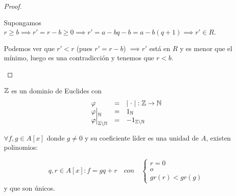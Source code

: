 \begin{proof}
\begin{itemize}
Supongamos $ r \geq b\implies r' = r-b \geq 0 \implies r' = a-bq -b = a -b(q+1)\implies r' \in R$.

Podemos ver que $r' < r$ (pues $r'=r-b$) $\implies  r'$ está en $R$ y es menor que el mínimo, luego es una contradicción y tenemos que $r < b$.

\end{itemize}




\end{proof}

\begin{ncor}
$\mathbb{Z}$ es un dominio de Euclides con
  \[
  \begin{array}{lll}
  \varphi & = & \abs{\;\cdot\;}: \ent \to \nat \\
  \restr{\varphi}{\nat} & = & 1_{\nat} \\
  \restr{\varphi}{\ent \setminus \nat} & = & -1_{\ent \setminus \nat}
\end{array}
\]
\end{ncor}

\begin{nth}
		$\forall f,g \in A[x]$ donde $g \neq 0 $ y su coeficiente líder es una unidad de $A$, existen polinomios:

	\[
	q,r \in A[x] : f = gq + r \quad con \quad
	 \begin{cases}
		r = 0\\
		o\\
		gr(r) < gr(g)
	\end{cases}
	\]
	y que son únicos.
\end{nth}

